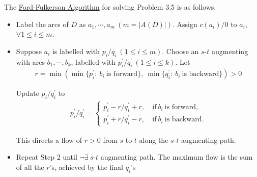 The \uline{Ford-Fulkerson Algorithm} for solving Problem 3.5 is as follows.
\begin{itemize}
    \item Label the arcs of $D$ as $a_1, \cdots, a_m\ (m = |A(D)|)$. Assign $c(a_i)/0$ to $a_i$, $\forall 1\leqslant i\leqslant m$.
    \item Suppose $a_i$ is labelled with $p_i/q_i\ (1\leqslant i\leqslant m)$. Choose an $s$-$t$ augmenting with arcs $b_1, \cdots, b_k$, labelled with $p^{\prime}_i/q^{\prime}_i\ (1\leqslant i\leqslant k)$. Let 
    \begin{align*}
        r = \min \left(\min \{p_i^{\prime}:\ b_i\ \text{is forward}\},\ \min \{q_i^{\prime}:\ b_i\ \text{is backward}\}\right) > 0
    \end{align*}

    Update $p^{\prime}_i/q^{\prime}_i$ to
    \begin{align*}
        p^{\prime}_i/q^{\prime}_i = \left\lbrace\begin{array}{ll}
            p^{\prime}_i - r/q^{\prime}_i + r, &\ \text{if} \ b_i \ \text{is forward},  \\
            p^{\prime}_i + r/q^{\prime}_i - r, &\ \text{if} \ b_i \ \text{is backward}.
        \end{array} \right.
    \end{align*}

    This directs a flow of $r>0$ from $s$ to $t$ along the $s$-$t$ augmenting path.
    \item Repeat Step 2 until $\neg\exists\ s$-$t$ augmenting path. The maximum flow is the sum of all the $r$'s, achieved by the final $q_i$'s
\end{itemize}
\newcommand{\setexampletoVariant}[1]{%
    \setcounter{example}{#1}%
    \renewcommand{\theexample}{\arabic{example}$'$}%
}
\setexampletoVariant{2}

